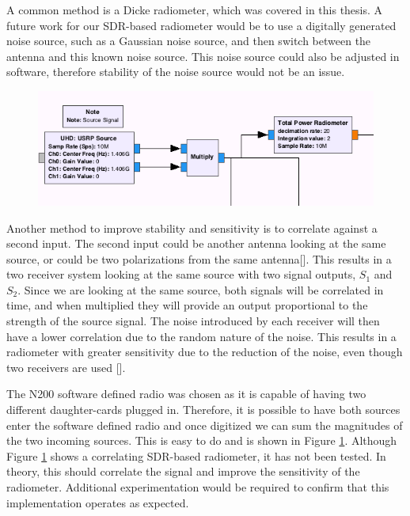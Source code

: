 A common method is a Dicke radiometer, which was covered in this thesis.  A future work for our SDR-based radiometer would be to use a digitally generated noise source, such as a Gaussian noise source, and then switch between the antenna and this known noise source.  This noise source could also be adjusted in software, therefore stability of the noise source would not be an issue.  

{\begin{figure}[h!tb] 
\centering
\includegraphics[width=14cm]{Images/N200_rad_corr.png}
\label{correlating_sdr}
\end{figure}
}

Another method to improve stability and sensitivity is to correlate against a second input.  The second input could be another antenna looking at the same source, or could be two polarizations from the same antenna[\cite{Clapp}].  This results in a two receiver system looking at the same source with two signal outputs, $S_1$ and $S_2$.  Since we are looking at the same source, both signals will be correlated in time, and when multiplied they will provide an output proportional to the strength of the source signal.  The noise introduced by each receiver will then have a lower correlation due to the random nature of the noise.  This results in a radiometer with greater sensitivity due to the reduction of the noise, even though two receivers are used [\cite{Fujimoto}].

The N200 software defined radio was chosen as it is capable of having two different daughter-cards plugged in.  Therefore, it is possible to have both sources enter the software defined radio and once digitized we can sum the magnitudes of the two incoming sources.  This is easy to do and is shown in Figure \ref{correlating_sdr}.  Although Figure \ref{correlating_sdr} shows a correlating SDR-based radiometer, it has not been tested.  In theory, this should correlate the signal and improve the sensitivity of the radiometer.  Additional experimentation would be required to confirm that this implementation operates as expected.



